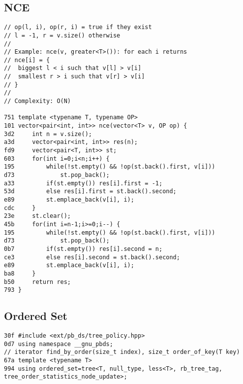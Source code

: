 \documentclass[11pt, a4paper, twoside]{article}
\begin{document}
\subsection{NCE}
\begin{lstlisting}
// op(l, i), op(r, i) = true if they exist
// l = -1, r = v.size() otherwise
//
// Example: nce(v, greater<T>()): for each i returns
// nce[i] = {
//  biggest l < i such that v[l] > v[i]
//  smallest r > i such that v[r] > v[i]
// }
//
// Complexity: O(N)

751 template <typename T, typename OP>
101 vector<pair<int, int>> nce(vector<T> v, OP op) {
3d2 	int n = v.size();
a3d 	vector<pair<int, int>> res(n);
fd9 	vector<pair<T, int>> st;
603 	for(int i=0;i<n;i++) {
195 		while(!st.empty() && !op(st.back().first, v[i])) 
d73 			st.pop_back();
a33 		if(st.empty()) res[i].first = -1;
53d 		else res[i].first = st.back().second;
e89 		st.emplace_back(v[i], i);
cdc 	}
23e 	st.clear();
45b 	for(int i=n-1;i>=0;i--) {
195 		while(!st.empty() && !op(st.back().first, v[i])) 
d73 			st.pop_back();
0b7 		if(st.empty()) res[i].second = n;
ce3 		else res[i].second = st.back().second;
e89 		st.emplace_back(v[i], i);
ba8 	}
b50 	return res;
793 }
\end{lstlisting}

\subsection{Ordered Set}
\begin{lstlisting}
30f #include <ext/pb_ds/tree_policy.hpp>
0d7 using namespace __gnu_pbds;
// iterator find_by_order(size_t index), size_t order_of_key(T key)
67a template <typename T> 
994 using ordered_set=tree<T, null_type, less<T>, rb_tree_tag, tree_order_statistics_node_update>;
\end{lstlisting}
\end{document}
